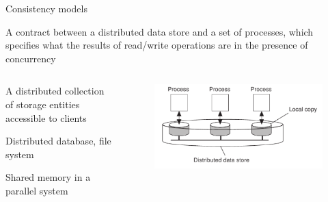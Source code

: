 \begin{frame}{Consistency models}
	
\begin{definition}
A contract between a distributed data store and a set of processes, which 
specifies what the results of read/write operations are in the 
presence of concurrency
\end{definition}

\bigskip
\begin{columns}[t]

\begin{column}{0.52\textwidth}

\begin{definition}
A distributed collection of storage entities accessible to clients
{\footnotesize
\BI
\item Distributed database, file system
\item Shared memory in a parallel system
\EI
}
\end{definition}

\end{column}
\hfill
\begin{column}{0.43\textwidth}

\begin{figure}
\includegraphics[width=\textwidth]{datastore}
\end{figure}

\end{column}

\end{columns}

\end{frame}

